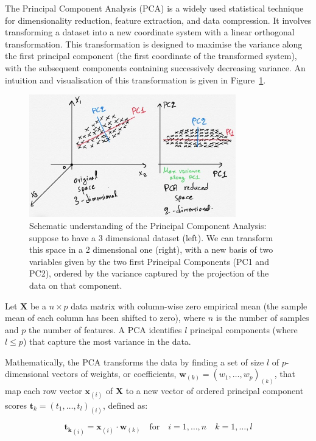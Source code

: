 The Principal Component Analysis (PCA) is a widely used statistical technique for dimensionality reduction, feature extraction, and data compression. It involves transforming a dataset into a new coordinate system with a linear orthogonal transformation. This transformation is designed to maximise the variance along the first principal component (the first coordinate of the transformed system), with the subsequent components containing successively decreasing variance.
An intuition and visualisation of this transformation is given in Figure~\ref{fig:pca}.

\begin{figure}
    \centering
    \includegraphics[width=0.8\textwidth]{figures/pca.jpg}
    \caption{Schematic understanding of the Principal Component Analysis: suppose to have a 3 dimensional dataset (left). We can transform this space in a 2 dimensional one (right), with a new basis of two variables given by the two first Principal Components (PC1 and PC2), ordered by the variance captured by the projection of the data on that component.}
    \label{fig:pca}
\end{figure}


Let $\mathbf{X}$ be a $n \times p$ data matrix with column-wise zero empirical mean (the sample mean of each column has been shifted to zero), where $n$ is the number of samples and $p$ the number of features. A PCA identifies $l$ principal components (where $l \leq p$) that capture the most variance in the data.

Mathematically, the PCA transforms the data by finding a set of size $l$ of $p$-dimensional vectors of weights, or coefficients, $\mathbf{w}_{(k)} = (w_1, \ldots, w_p)_{(k)}$, that map each row vector $\mathbf{x}_{(i)}$ of $\mathbf{X}$ to a new vector of ordered principal component scores $\mathbf{t}_{k} = (t_1, \ldots, t_l)_{(i)}$, defined as:

\begin{equation}
\mathbf{t_{k}}_{(i)} = \mathbf{x}_{(i)} \cdot \mathbf{w}_{(k)} \quad \text{for} \quad i = 1, \ldots, n \quad k = 1, \ldots, l
\end{equation}

